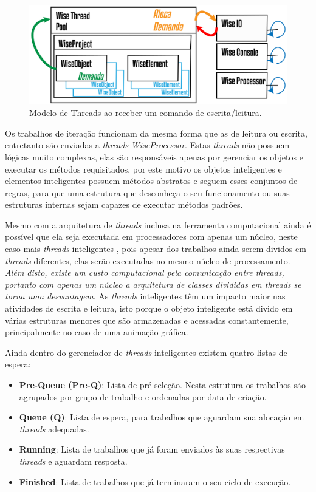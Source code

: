 \begin{figure}[!htbp]
	\centering
	\includegraphics[width=\linewidth]{Figures/WiseThreadPoolHeating@16x.png}
	\caption{Modelo de Threads ao receber um comando de escrita/leitura.}
	\label{fig9:threads}
\end{figure}

Os trabalhos de iteração funcionam da mesma forma que as de leitura ou escrita, entretanto são enviadas a \textit{threads} \textit{WiseProcessor}. Estas \textit{threads} não possuem lógicas muito complexas, elas são responsáveis apenas por gerenciar os objetos e executar os métodos requisitados, por este motivo os objetos inteligentes e elementos inteligentes possuem métodos abstratos e seguem esses conjuntos de regras, para que uma estrutura que desconheça o seu funcionamento ou suas estruturas internas sejam capazes de executar métodos padrões. 

Mesmo com a arquitetura de \textit{threads} inclusa na ferramenta computacional ainda é possível que ela seja executada em processadores com apenas um núcleo, neste caso mais \textit{threads} inteligentes , pois apesar dos trabalhos ainda serem dividos em \textit{threads} diferentes, elas serão executadas no mesmo núcleo de processamento. \textit{Além disto, existe um custo computacional pela comunicação entre threads, portanto com apenas um núcleo a arquitetura de classes divididas em \textit{threads} se torna uma desvantagem}. As \textit{threads} inteligentes têm um impacto maior nas atividades de escrita e leitura, isto porque o objeto inteligente está divido em várias estruturas menores que são armazenadas e acessadas constantemente, principalmente no caso de uma animação gráfica.

Ainda dentro do gerenciador de \textit{threads} inteligentes existem quatro listas de espera:

\begin{itemize}
	\item \textbf{Pre-Queue (Pre-Q)}: Lista de pré-seleção. Nesta estrutura os trabalhos são agrupados por grupo de trabalho e ordenadas por data de criação.
	\item \textbf{Queue (Q)}: Lista de espera, para trabalhos que aguardam sua alocação em \textit{threads} adequadas.
	\item \textbf{Running}: Lista de trabalhos que já foram enviados às suas respectivas \textit{threads} e aguardam resposta.
	\item \textbf{Finished}: Lista de trabalhos que já terminaram o seu ciclo de execução.
\end{itemize}

